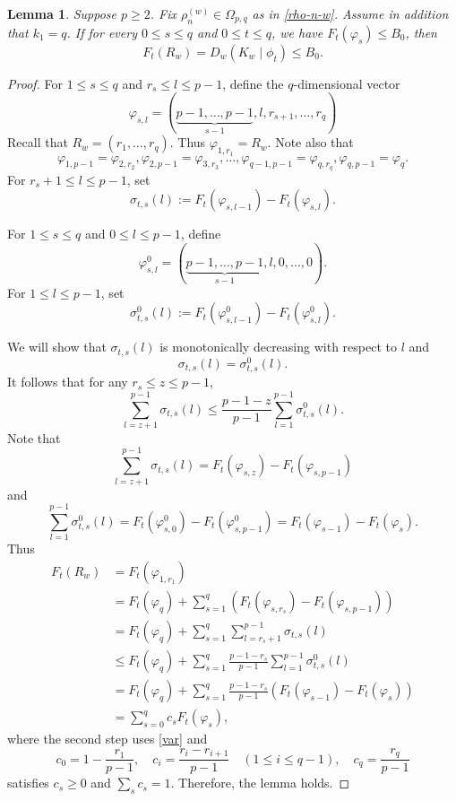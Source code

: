 \documentclass[10pt,a4paper]{amsart}
\newtheorem{lemma}{Lemma}
\begin{document}
\begin{lemma}\label{lem-p}
Suppose $p\ge 2$. Fix $\rho_n^{(w)}\in\Omega_{p,q}$ as in \eqref{rho-n-w}. Assume in addition that $k_1=q$.
	If for every $0\le s\le q$ and $0\le t\le q$, we have $F_t(\varphi_s)\le B_0$, then
	\[F_t(R_w)=D_w(K_w\mid \phi_t)\le B_0.\]
\end{lemma}

\begin{proof}	For $1\le s\le q$ and $r_{s}\le l\le p-1$, define the $q$-dimensional vector
	\[\varphi_{s,l}=(\underbrace{p-1,\dots,p-1}_{s-1},l,r_{s+1},\dots,r_q)\]
Recall that $R_w=(r_1,\dots,r_q)$.	
Thus $\varphi_{1,r_1}=R_w$. Note also that
\begin{equation}\label{var}
\varphi_{1, p-1}=\varphi_{2, r_2}, \varphi_{2, p-1}=\varphi_{3, r_3}, \dots,
\varphi_{q-1, p-1}=\varphi_{q, r_q}, \varphi_{q, p-1}=\varphi_{q}.
\end{equation}
For $r_{s}+1\le l\le p-1$, set
\[\sigma_{t,s}(l):=F_t(\varphi_{s,l-1})-F_t(\varphi_{s,l}).\]

For $1\le s\le q$ and $0\le l\le p-1$, define
\[\varphi_{s,l}^0=(\underbrace{p-1,\dots,p-1}_{s-1},l,0,\dots,0).\]
For $1\le l\le p-1$, set
	\[\sigma_{t,s}^0(l):=F_t(\varphi^0_{s,l-1})-F_t(\varphi^0_{s,l}).\]
	

We will show that $\sigma_{t,s}(l)$ is monotonically decreasing with respect to $l$ and
	\[\sigma_{t,s}(l)=\sigma_{t,s}^0(l).\]
It follows that for any $r_s\le z\le p-1$,
	\[\sum_{l=z+1}^{p-1}\sigma_{t,s}(l)\le \frac{p-1-z}{p-1}\sum_{l=1}^{p-1}\sigma_{t,s}^0(l).\]
	Note that	\[\sum_{l=z+1}^{p-1}\sigma_{t,s}(l)=F_t(\varphi_{s,z})-F_{t}(\varphi_{s,p-1})\]
	and
\[
\sum_{l=1}^{p-1}\sigma^0_{t,s}(l)
=F_t(\varphi_{s,0}^0)-F_{t}(\varphi_{s,p-1}^0)
=F_t(\varphi_{s-1})-F_t(\varphi_s).\]
	Thus
	\begin{align*}
		F_t(R_w)&= F_t(\varphi_{1, r_1})\\
&=F_t(\varphi_{q}) + \sum_{s=1}^{q} (F_t(\varphi_{s, r_s}) - F_t(\varphi_{s, p-1}))\\
&=F_t(\varphi_{q})+\sum_{s=1}^q\sum_{l=r_s+1}^{p-1}\sigma_{t,s}(l)\\
		&\le F_t(\varphi_{q})+\sum_{s=1}^q  \frac{p-1-r_s}{p-1} \sum_{l=1}^{p-1} \sigma^0_{t,s}(l)\\
&= F_t(\varphi_{q})+\sum_{s=1}^q  \frac{p-1-r_s}{p-1} (F_t(\varphi_{s-1})-F_t(\varphi_s))\\
&=\sum_{s=0}^qc_s F_t(\varphi_s),
	\end{align*}
	where the second step uses \eqref{var} and
	\[c_0=1-\dfrac{r_1}{p-1},\quad c_i=\dfrac{r_{i}-r_{i+1}}{p-1}\quad(1\le i\le q-1),\quad
	c_q=\dfrac{r_q}{p-1}\]
	satisfies $c_s\ge 0$ and $\sum_sc_s=1$. Therefore, the lemma holds.



\end{proof}
\end{document}
